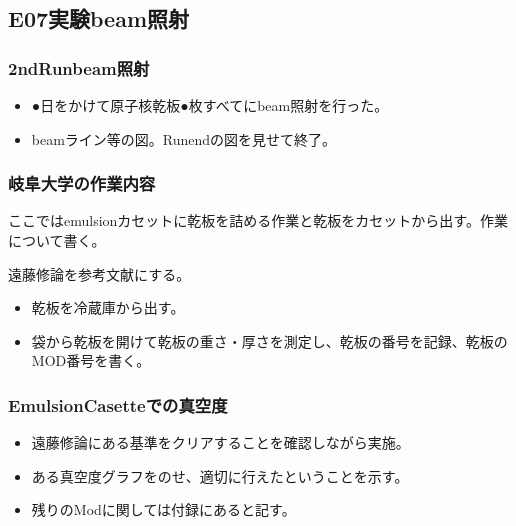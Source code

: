 \documentclass[12pt,a4paper]{jarticle}
\begin{document}
\subsection{E07実験beam照射}
\subsubsection{2ndRunbeam照射}
\begin{itemize}
 \item ●日をかけて原子核乾板●枚すべてにbeam照射を行った。
 \item beamライン等の図。Runendの図を見せて終了。
\end{itemize}
\subsubsection{岐阜大学の作業内容}
ここではemulsionカセットに乾板を詰める作業と乾板をカセットから出す。作業について書く。\par
遠藤修論を参考文献にする。
\begin{itemize}
 \item 乾板を冷蔵庫から出す。
 \item 袋から乾板を開けて乾板の重さ・厚さを測定し、乾板の番号を記録、乾板のMOD番号を書く。
\end{itemize}
\subsubsection{EmulsionCasetteでの真空度}
\begin{itemize}
 \item 遠藤修論にある基準をクリアすることを確認しながら実施。
 \item ある真空度グラフをのせ、適切に行えたということを示す。
 \item 残りのModに関しては付録にあると記す。
\end{itemize}
\end{document}

